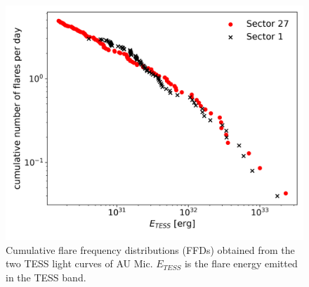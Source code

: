 \documentclass[fleqn,usenatbib]{mnras}%
\begin{document}
\begin{figure}
\includegraphics[width=\hsize]{figures/ffd.png} 
\caption{Cumulative flare frequency distributions (FFDs) obtained from the two TESS light curves of AU Mic. $E_{TESS}$ is the flare energy emitted in the TESS band.}
\label{fig:ffd}
\end{figure}
\end{document}
